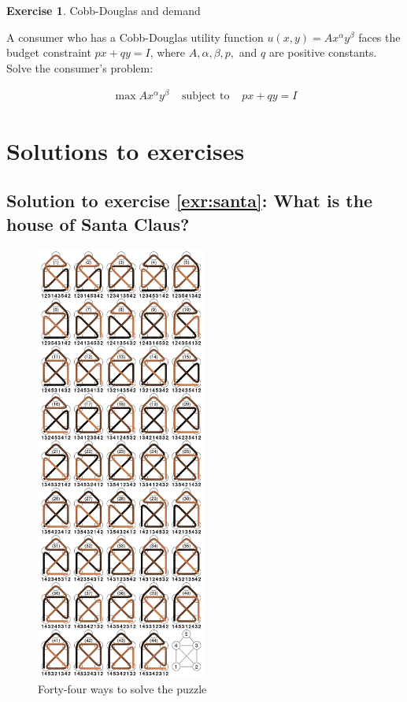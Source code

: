 \documentclass[
  12pt,
  oneside]{book}
\theoremstyle{definition}
\theoremstyle{definition}
\theoremstyle{definition}
\newtheorem{exercise}{Exercise}[chapter]
\theoremstyle{definition}
\theoremstyle{remark}
\begin{document}
\begin{exercise}
\protect\hypertarget{exr:cdanddemand}{}\label{exr:cdanddemand}Cobb-Douglas and demand

A consumer who has a Cobb-Douglas utility function \(u(x, y)=A x^{\alpha} y^{\beta}\)
faces the budget constraint \(p x+q y=I\), where \(A, \alpha, \beta, p,\) and \(q\) are
positive constants.
Solve the consumer's problem:

\[
\begin{array}{lll}
\max A x^{\alpha} y^{\beta} & \text { subject to } & p x+q y=I
\end{array}
\]

\hypertarget{solutions-to-exercises}{%
\section{Solutions to exercises}\label{solutions-to-exercises}}

\hypertarget{sol:santa}{%
\subsection*{Solution to exercise \ref{exr:santa}: What is the house of Santa Claus?}\label{sol:santa}}

\begin{figure}
\centering
\includegraphics[width=0.5\textwidth,height=\textheight]{fig/nikolaus2.png}
\caption[\label{fig:nikolaus2} Forty-four ways to solve the puzzle]{\label{fig:nikolaus2} Forty-four ways to solve the puzzle\footnotemark{}}
\end{figure}


\end{exercise}
\end{document}
